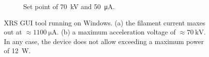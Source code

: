 \begin{figure}
\begin{subfigure}{.3\textwidth}
            \caption[Set point of \qty{70}{kV} and \qty{50}{\micro\ampere}]{Set point of \qty{70}{kV} and \qty{50}{\micro\ampere}.}%
            \label{subfig:12WattController 70kV}
        \end{subfigure}
        \caption[XRS GUI tool running on Windows]{XRS GUI tool running on Windows. (a) the filament current maxes out at \(\approx \qty{1100}{\micro\ampere}\). (b) a maximum acceleration voltage of \(\approx\qty{70}{\kilo\volt}\). In any case, the device does not allow exceeding a maximum power of \qty{12}{\watt}.}%
        \label{fig:12WattController 10kV and 70kV}
    \end{figure}
